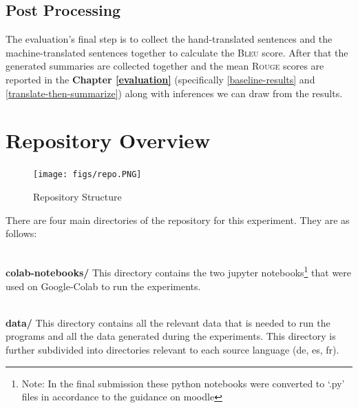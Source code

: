 \documentclass[12pt,a4paper,twoside,openright]{report}
\newcommand{\red}[1]{\textcolor{red}{#1}}
\newcommand{\bleu}{\textsc{Bleu} }
\newcommand{\rouge}{\textsc{Rouge} }
\begin{document}

\subsection{Post Processing}
\label{postprocessing}

The evaluation's final step is to collect the hand-translated sentences and the machine-translated sentences together to calculate the \bleu score. After that the generated summaries are collected together and the mean \rouge scores are reported in the \textbf{Chapter \ref{evaluation} } (specifically \ref{baseline-results} and \ref{translate-then-summarize}) along with inferences we can draw from the results.


\newpage
\section{Repository Overview}
\phantom{.}


\begin{figure}
    \texttt{[image: figs/repo.PNG]}
    \caption{Repository Structure}
    \label{fig:repository-structure}
\end{figure}

There are four main directories of the repository for this experiment. They are as follows:

\phantom{.}\\
\textbf{colab-notebooks/} This directory contains the two jupyter notebooks\footnote{Note: In the final submission these python notebooks were converted to `.py' files in accordance to the guidance on moodle} that were used on Google-Colab to run the experiments.

\phantom{.}\\
\textbf{data/} This directory contains all the relevant data that is needed to run the programs and all the data generated during the experiments. This directory is further subdivided into directories relevant to each source language (de, es, fr).
\end{document}
